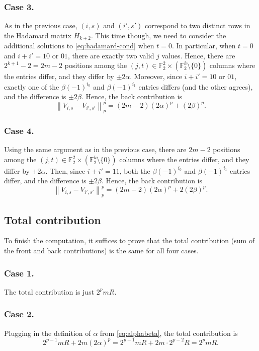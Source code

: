 \documentclass[11pt,reqno]{amsart}
\theoremstyle{plain}
\theoremstyle{definition}
\theoremstyle{remark}
\newcommand{\F}{\mathbb{F}}
\newcommand{\norm}[1]{\left\lVert #1 \right\rVert}
\numberwithin{equation}{section}
\begin{document}
\subsubsection*{Case 3.}
As in the previous case, $(i,s)$ and $(i',s')$ correspond to two distinct rows in the Hadamard matrix $H_{k+2}$. This time though, we need to consider the additional solutions to \eqref{eq:hadamard-cond} when $t=0$. In particular, when $t=0$ and $i+i'=10\text{ or }01$, there are exactly two valid $j$ values. Hence, there are $2^{k+1}-2=2m-2$ positions among the $(j,t)\in\F_2^2\times \left(\F_2^k\setminus\{0\}\right)$ columns where the entries differ, and they differ by $\pm 2\alpha$. Moreover, since $i+i'=10\text{ or }01$, exactly one of the $\beta(-1)^{i_0}$ and $\beta(-1)^{i_1}$ entries differs (and the other agrees), and the difference is $\pm 2\beta$. Hence, the back contribution is
\[\norm{V_{i,s}-V_{i',s'}}_p^p=(2m-2)(2\alpha)^p+(2\beta)^p.\]

\subsubsection*{Case 4.}
Using the same argument as in the previous case, there are $2m-2$ positions among the $(j,t)\in\F_2^2\times\left(\F_2^k\setminus\{0\}\right)$ columns where the entries differ, and they differ by $\pm 2\alpha$. Then, since $i+i'=11$, both the $\beta(-1)^{i_0}$ and $\beta(-1)^{i_1}$ entries differ, and the difference is $\pm 2\beta$. Hence, the back contribution is
\[\norm{V_{i,s}-V_{i',s'}}_p^p=(2m-2)(2\alpha)^p+2(2\beta)^p.\]

\subsection{Total contribution}
To finish the computation, it suffices to prove that the total contribution (sum of the front and back contributions) is the same for all four cases.

\subsubsection*{Case 1.}
The total contribution is just $2^pmR$. 

\subsubsection*{Case 2.}
Plugging in the definition of $\alpha$ from \eqref{eq:alphabeta}, the total contribution is
\[2^{p-1}mR+2m(2\alpha)^p=2^{p-1}mR+2m\cdot 2^{p-2}R=2^pmR.\]
\end{document}
